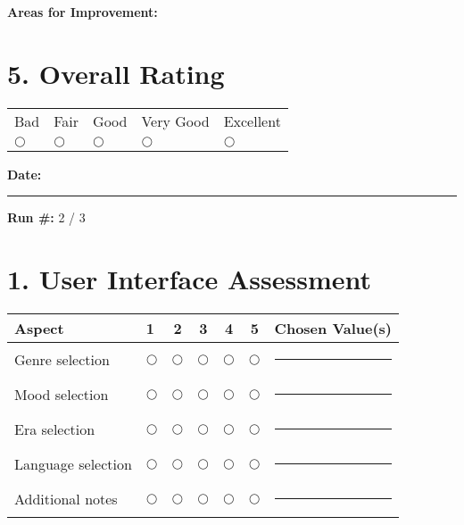 \documentclass[11pt]{article}
\begin{document}
  \noindent \textbf{Areas for Improvement:}
  \vspace{2cm}

  \section*{5. Overall Rating}
  \vspace{0.5cm}
  \begin{center}
    \begin{tabular}{p{1.8cm}p{1.8cm}p{1.8cm}p{1.8cm}p{1.8cm}}
      Bad & Fair & Good & Very Good & Excellent\\
      $\bigcirc$ & $\bigcirc$ & $\bigcirc$ & $\bigcirc$ & $\bigcirc$\\
    \end{tabular}
  \end{center}


  \begin{center}
    \textbf{Date:} \rule{3cm}{0.15mm} \hspace{0.5cm}
    \textbf{Run \#:} 2 / 3
  \end{center}

  \vspace{0.5cm}

  \section*{1. User Interface Assessment}
  \begin{center}
    \begin{tabular}{p{5cm}lccccl}
        \textbf{Aspect} & \textbf{1} & \textbf{2} & \textbf{3} & \textbf{4} & \textbf{5} & \textbf{Chosen Value(s)}\\
        \toprule
        Genre selection & $\bigcirc$ & $\bigcirc$ & $\bigcirc$ & $\bigcirc$ & $\bigcirc$ & \rule{6cm}{0.15mm}\\
        Mood selection & $\bigcirc$ & $\bigcirc$ & $\bigcirc$ & $\bigcirc$ & $\bigcirc$ & \rule{6cm}{0.15mm}\\
        Era selection & $\bigcirc$ & $\bigcirc$ & $\bigcirc$ & $\bigcirc$ & $\bigcirc$ & \rule{6cm}{0.15mm}\\
        Language selection & $\bigcirc$ & $\bigcirc$ & $\bigcirc$ & $\bigcirc$ & $\bigcirc$ & \rule{6cm}{0.15mm}\\
        Additional notes & $\bigcirc$ & $\bigcirc$ & $\bigcirc$ & $\bigcirc$ & $\bigcirc$ & \rule{6cm}{0.15mm}\\
    \end{tabular}
  \end{center}
\end{document}
